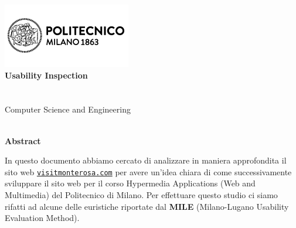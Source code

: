 \makeatletter
\begin{titlepage}
	\begin{center} 
		\includegraphics{resources/images/logo_polimi.png}\\[4ex]
		{\Huge \bfseries \sffamily Usability Inspection}\\[2ex]
		{\huge \bfseries \sffamily \@title }\\[8ex] 
		{\Large  \@author}\\[5ex] 
		Computer Science and Engineering\\[5ex]
		\@date\\[5ex]
		\fontsize{15pt}{12pt}\selectfont
 
	\vspace{\fill}
		\large \textbf{Abstract}
	\end{center}
	\begin{flushleft} 
		In questo documento abbiamo cercato di analizzare in maniera approfondita il sito web \href{https://www.visitmonterosa.com/}{\texttt{visitmonterosa.com}}
		per avere un'idea chiara di come successivamente sviluppare il sito web per il corso Hypermedia Applications (Web and Multimedia) del Politecnico di Milano.
		Per effettuare questo studio ci siamo rifatti ad alcune delle euristiche riportate dal \textbf{MILE} (Milano-Lugano Usability Evaluation Method).
	\end{flushleft}
\end{titlepage}
\makeatother 
\thispagestyle{empty}
\setcounter{page}{1} %